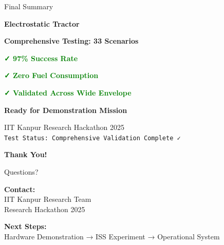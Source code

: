 \documentclass[aspectratio=169]{beamer}
\begin{document}
\begin{frame}{Final Summary}
\begin{center}
\LARGE\textbf{Electrostatic Tractor}

\vspace{1em}

\Large\textbf{Comprehensive Testing: 33 Scenarios}

\vspace{2em}

\textcolor{green}{\textbf{✓ 97\% Success Rate}}

\textcolor{green}{\textbf{✓ Zero Fuel Consumption}}

\textcolor{green}{\textbf{✓ Validated Across Wide Envelope}}

\vspace{2em}

\textbf{Ready for Demonstration Mission}

\vspace{1em}

\normalsize
IIT Kanpur Research Hackathon 2025\\
\texttt{Test Status: Comprehensive Validation Complete ✓}
\end{center}
\end{frame}

\begin{frame}
\begin{center}
\Huge\textbf{Thank You!}

\vspace{2em}

\Large Questions?

\vspace{2em}

\normalsize
\textbf{Contact:}\\
IIT Kanpur Research Team\\
Research Hackathon 2025

\vspace{1em}

\textbf{Next Steps:}\\
Hardware Demonstration → ISS Experiment → Operational System
\end{center}
\end{frame}
\end{document}
